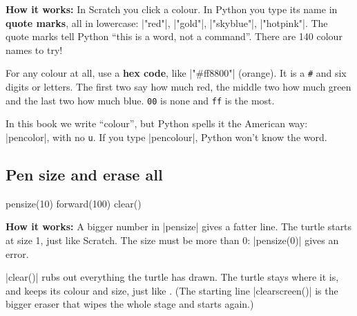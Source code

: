 \textbf{How it works:} In Scratch you click a colour. In Python you type its name in \textbf{quote marks}, all in lowercase: \py|"red"|, \py|"gold"|, \py|"skyblue"|, \py|"hotpink"|. The quote marks tell Python ``this is a word, not a command''. There are 140 colour names to try!

For any colour at all, use a \textbf{hex code}, like \py|"#ff8800"| (orange). It is a \texttt{\#} and six digits or letters. The first two say how much red, the middle two how much green and the last two how much blue. \texttt{00} is none and \texttt{ff} is the most.

\begin{watchout}
In this book we write ``colour'', but Python spells it the American way: \py|pencolor|, with no \texttt{u}. If you type \py|pencolour|, Python won't know the word.
\end{watchout}

\subsection*{Pen size and erase all}

\begin{tcbraster}[raster columns=2, raster equal height=rows, raster column skip=12pt, raster valign=center]
\begin{tcolorbox}[colback=white, colframe=white, boxrule=0pt, valign=center]
\begin{scratch}
\end{scratch}
\end{tcolorbox}
\begin{code}
pensize(10)
forward(100)
clear()
\end{code}
\end{tcbraster}

\textbf{How it works:} A bigger number in \py|pensize| gives a fatter line. The turtle starts at size 1, just like Scratch. The size must be more than 0: \py|pensize(0)| gives an error.

\py|clear()| rubs out everything the turtle has drawn. The turtle stays where it is, and keeps its colour and size, just like . (The starting line \py|clearscreen()| is the bigger eraser that wipes the whole stage and starts again.)

